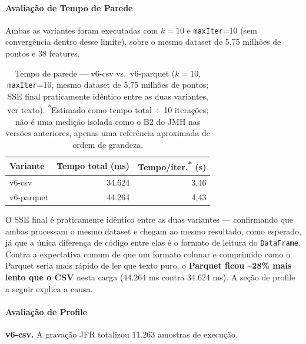 \paragraph{Avaliação de Tempo de Parede}

Ambas as variantes foram executadas com $k=10$ e \texttt{maxIter}=10
(sem convergência dentro desse limite), sobre o mesmo dataset de 5,75
milhões de pontos e 38 features.

\begin{table}[H]
\centering
\begin{tabular}{lrr}
\hline
\textbf{Variante} & \textbf{Tempo total (ms)} & \textbf{Tempo/iter.\textsuperscript{*} (s)} \\
\hline
v6-csv     & 34.624 & 3{,}46 \\
v6-parquet & 44.264 & 4{,}43 \\
\hline
\end{tabular}
\caption{Tempo de parede --- v6-csv vs.\ v6-parquet ($k=10$, \texttt{maxIter}=10,
mesmo dataset de 5,75 milhões de pontos; SSE final praticamente idêntico
entre as duas variantes, ver texto).
\textsuperscript{*}Estimado como tempo total $\div$ 10 iterações; não é uma
medição isolada como o B2 do JMH nas versões anteriores, apenas uma
referência aproximada de ordem de grandeza.}
\label{tab:wallclock-v6}
\end{table}

O SSE final é praticamente idêntico entre as duas variantes ---
confirmando que ambas processam o mesmo dataset e chegam ao mesmo
resultado, como esperado, já que a única diferença de código entre elas
é o formato de leitura do \texttt{DataFrame}. Contra a expectativa comum
de que um formato colunar e comprimido como o Parquet seria mais rápido
de ler que texto puro, o \textbf{Parquet ficou \textasciitilde28\% mais
lento que o CSV} nesta carga (44.264 ms contra 34.624 ms). A seção de
profile a seguir explica a causa.

\paragraph{Avaliação de Profile}

\textbf{v6-csv.} A gravação JFR totalizou 11.263 amostras de execução.

